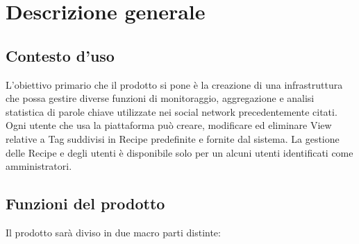 %



\section{Descrizione generale}

\subsection{Contesto d'uso}
L'obiettivo primario che il prodotto si pone è la creazione di una infrastruttura che
possa gestire diverse funzioni di monitoraggio, aggregazione e analisi statistica di parole chiave utilizzate nei social network precedentemente citati. Ogni utente che usa la piattaforma può creare, modificare ed eliminare View relative a Tag suddivisi in Recipe predefinite e fornite dal sistema.
La gestione delle Recipe e degli utenti è disponibile solo per un alcuni utenti identificati come amministratori.

\subsection{Funzioni del prodotto}
Il prodotto sarà diviso in due macro parti distinte:

